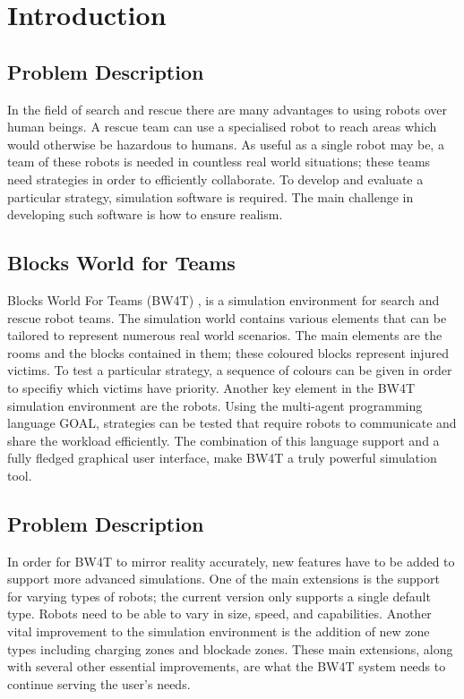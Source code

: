 \chapter{Introduction}



\section{Problem Description}
In the field of search and rescue there are many advantages to using robots over human beings. A rescue team can use a specialised robot to reach areas which would otherwise be hazardous to humans. As useful as a single robot may be, a team of these robots is needed in countless real world situations; these teams need strategies in order to efficiently collaborate. To develop and evaluate a particular strategy, simulation software is required. The main challenge in developing such software is how to ensure realism. 



\section{Blocks World for Teams}
Blocks World For Teams (BW4T) \cite{bw4t}, is a simulation environment for search and rescue robot teams. The simulation world contains various elements that can be tailored to represent numerous real world scenarios. The main elements are the rooms and the blocks contained in them; these coloured blocks represent injured victims. To test a particular strategy, a sequence of colours can be given in order to specifiy which victims have priority. Another key element in the BW4T simulation environment are the robots. Using the multi-agent programming language GOAL, strategies can be tested that require robots to communicate and share the workload efficiently. The combination of this language support and a fully fledged graphical user interface, make BW4T a truly powerful simulation tool.


\section{Problem Description}
In order for BW4T to mirror reality accurately, new features have to be added to support more advanced simulations. One of the main extensions is the support for varying types of robots; the current version only supports a single default type. Robots need to be able to vary in size, speed, and capabilities. Another vital improvement to the simulation environment is the addition of new zone types including charging zones and blockade zones. These main extensions, along with several other essential improvements, are what the BW4T system needs to continue serving the user's needs.

